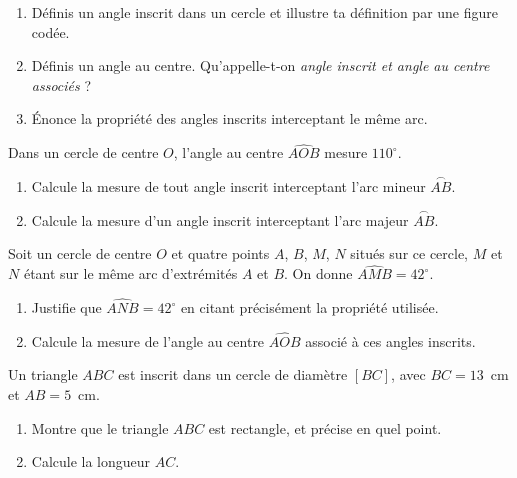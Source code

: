 \documentclass[11pt]{article}
\newcounter{popsec}
\newcounter{popsub}
\newcommand{\courssub}[1]{%
  \stepcounter{popsub}%
  \par\vspace{9pt}\noindent{\popxbold\fontsize{11.5}{13}\selectfont\color{popink}{\color{poporange}\thepopsec.\thepopsub}\hspace{6pt}#1}\par\nopagebreak\vspace{4pt}
}
\begin{document}
\begin{exercice}[Définitions]
\begin{enumerate}
\item Définis un angle inscrit dans un cercle et illustre ta définition par une figure codée.
\item Définis un angle au centre. Qu'appelle-t-on \emph{angle inscrit et angle au centre associés} ?
\item Énonce la propriété des angles inscrits interceptant le même arc.
\end{enumerate}
\end{exercice}

\begin{exercice}
Dans un cercle de centre $O$, l'angle au centre $\widehat{AOB}$ mesure $110^{\circ}$.
\begin{enumerate}
\item Calcule la mesure de tout angle inscrit interceptant l'arc mineur $\overset{\frown}{AB}$.
\item Calcule la mesure d'un angle inscrit interceptant l'arc majeur $\overset{\frown}{AB}$.
\end{enumerate}
\end{exercice}

\courssub{Je m'entraîne}

\begin{exercice}
Soit un cercle de centre $O$ et quatre points $A$, $B$, $M$, $N$ situés sur ce cercle, $M$ et $N$ étant sur le même arc d'extrémités $A$ et $B$. On donne $\widehat{AMB} = 42^{\circ}$.
\begin{enumerate}
\item Justifie que $\widehat{ANB} = 42^{\circ}$ en citant précisément la propriété utilisée.
\item Calcule la mesure de l'angle au centre $\widehat{AOB}$ associé à ces angles inscrits.
\end{enumerate}
\end{exercice}

\begin{exercice}
Un triangle $ABC$ est inscrit dans un cercle de diamètre $[BC]$, avec $BC = 13$~cm et $AB = 5$~cm.
\begin{enumerate}
\item Montre que le triangle $ABC$ est rectangle, et précise en quel point.
\item Calcule la longueur $AC$.
\end{enumerate}
\end{exercice}
\end{document}

